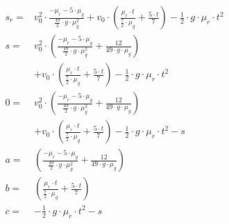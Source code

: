 \begin{equation}
\begin{aligned}

s_r = & v_0^2 \cdot \frac{-\mu_r - 5 \cdot \mu_g}{\frac{49}{2} \cdot g \cdot \mu_g^2} + v_0 \cdot (\frac{\mu_r \cdot t}{\frac{7}{2} \cdot \mu_g} + \frac{5 \cdot t}{7}) - \frac{1}{2} \cdot g \cdot \mu_r \cdot t^2\\
s = & v_0^2 \cdot (\frac{-\mu_r - 5 \cdot \mu_g}{\frac{49}{2} \cdot g \cdot \mu_g^2} + \frac{12}{49 \cdot g \cdot \mu_g})\\
    & + v_0 \cdot (\frac{\mu_r \cdot t}{\frac{7}{2} \cdot \mu_g} + \frac{5 \cdot t}{7}) - \frac{1}{2} \cdot g \cdot \mu_r \cdot t^2\\
0 = & v_0^2 \cdot (\frac{-\mu_r - 5 \cdot \mu_g}{\frac{49}{2} \cdot g \cdot \mu_g^2} + \frac{12}{49 \cdot g \cdot \mu_g})\\
    & + v_0 \cdot (\frac{\mu_r \cdot t}{\frac{7}{2} \cdot \mu_g} + \frac{5 \cdot t}{7}) - \frac{1}{2} \cdot g \cdot \mu_r \cdot t^2 - s\\
a = & (\frac{-\mu_r - 5 \cdot \mu_g}{\frac{49}{2} \cdot g \cdot \mu_g^2} + \frac{12}{49 \cdot g \cdot \mu_g})\\
b = & (\frac{\mu_r \cdot t}{\frac{7}{2} \cdot \mu_g} + \frac{5 \cdot t}{7})\\
c = & -\frac{1}{2} \cdot g \cdot \mu_r \cdot t^2 - s
\end{aligned}
\end{equation}

